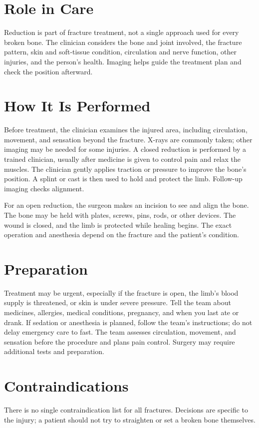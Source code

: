 \section*{Role in Care}
Reduction is part of fracture treatment, not a single approach used for every broken bone. The clinician considers the bone and joint involved, the fracture pattern, skin and soft-tissue condition, circulation and nerve function, other injuries, and the person's health. Imaging helps guide the treatment plan and check the position afterward.

\section*{How It Is Performed}
Before treatment, the clinician examines the injured area, including circulation, movement, and sensation beyond the fracture. X-rays are commonly taken; other imaging may be needed for some injuries. A closed reduction is performed by a trained clinician, usually after medicine is given to control pain and relax the muscles. The clinician gently applies traction or pressure to improve the bone's position. A splint or cast is then used to hold and protect the limb. Follow-up imaging checks alignment.

For an open reduction, the surgeon makes an incision to see and align the bone. The bone may be held with plates, screws, pins, rods, or other devices. The wound is closed, and the limb is protected while healing begins. The exact operation and anesthesia depend on the fracture and the patient's condition.

\section*{Preparation}
Treatment may be urgent, especially if the fracture is open, the limb's blood supply is threatened, or skin is under severe pressure. Tell the team about medicines, allergies, medical conditions, pregnancy, and when you last ate or drank. If sedation or anesthesia is planned, follow the team's instructions; do not delay emergency care to fast. The team assesses circulation, movement, and sensation before the procedure and plans pain control. Surgery may require additional tests and preparation.

\section*{Contraindications}
There is no single contraindication list for all fractures. Decisions are specific to the injury; a patient should not try to straighten or set a broken bone themselves.

